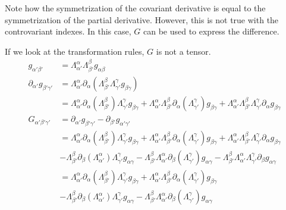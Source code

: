 \documentclass[11pt]{article}
\begin{document}
Note how the symmetrization of the covariant derivative is equal to the symmetrization of the partial derivative. However, this is not true with the controvariant indexes. In this case, $G$ can be used to express the difference.

If we look at the transformation rules, $G$ is not a tensor.
\begin{equation*}
	\begin{aligned}
		g_{\alpha'\beta'}&=\Lambda_{\alpha'}^{\alpha}\Lambda_{\beta'}^{\beta}g_{\alpha\beta} \\
		\partial_{\alpha'}g_{\beta'\gamma'}&=\Lambda_{\alpha'}^{\alpha}\partial_{\alpha}\left(\Lambda_{\beta'}^{\beta}\Lambda_{\gamma'}^{\gamma}g_{\beta\gamma}\right) \\
		&=\Lambda_{\alpha'}^{\alpha}\partial_{\alpha}\left(\Lambda_{\beta'}^{\beta}\right)\Lambda_{\gamma'}^{\gamma}g_{\beta\gamma} + \Lambda_{\alpha'}^{\alpha}\Lambda_{\beta'}^{\beta}\partial_{\alpha}\left(\Lambda_{\gamma'}^{\gamma}\right)g_{\beta\gamma} + \Lambda_{\alpha'}^{\alpha}\Lambda_{\beta'}^{\beta}\Lambda_{\gamma'}^{\gamma}\partial_{\alpha}g_{\beta\gamma}\\
		G_{\alpha'\beta'\gamma'} &= \partial_{\alpha'}g_{\beta'\gamma'} - \partial_{\beta'}g_{\alpha'\gamma'}\\
		&= \Lambda_{\alpha'}^{\alpha}\partial_{\alpha}\left(\Lambda_{\beta'}^{\beta}\right)\Lambda_{\gamma'}^{\gamma}g_{\beta\gamma} + \Lambda_{\alpha'}^{\alpha}\Lambda_{\beta'}^{\beta}\partial_{\alpha}\left(\Lambda_{\gamma'}^{\gamma}\right)g_{\beta\gamma} + \Lambda_{\alpha'}^{\alpha}\Lambda_{\beta'}^{\beta}\Lambda_{\gamma'}^{\gamma}\partial_{\alpha}g_{\beta\gamma}\\
		&-\Lambda_{\beta'}^{\beta}\partial_{\beta}\left(\Lambda_{\alpha'}^{\alpha}\right)\Lambda_{\gamma'}^{\gamma}g_{\alpha\gamma} - \Lambda_{\beta'}^{\beta}\Lambda_{\alpha'}^{\alpha}\partial_{\beta}\left(\Lambda_{\gamma'}^{\gamma}\right)g_{\alpha\gamma} - \Lambda_{\beta'}^{\beta}\Lambda_{\alpha'}^{\alpha}\Lambda_{\gamma'}^{\gamma}\partial_{\beta}g_{\alpha\gamma}\\
		&=\Lambda_{\alpha'}^{\alpha}\partial_{\alpha}\left(\Lambda_{\beta'}^{\beta}\right)\Lambda_{\gamma'}^{\gamma}g_{\beta\gamma} + \Lambda_{\alpha'}^{\alpha}\Lambda_{\beta'}^{\beta}\partial_{\alpha}\left(\Lambda_{\gamma'}^{\gamma}\right)g_{\beta\gamma}\\
		&-\Lambda_{\beta'}^{\beta}\partial_{\beta}\left(\Lambda_{\alpha'}^{\alpha}\right)\Lambda_{\gamma'}^{\gamma}g_{\alpha\gamma} - \Lambda_{\beta'}^{\beta}\Lambda_{\alpha'}^{\alpha}\partial_{\beta}\left(\Lambda_{\gamma'}^{\gamma}\right)g_{\alpha\gamma}\\

\end{aligned}
\end{equation*}
\end{document}
